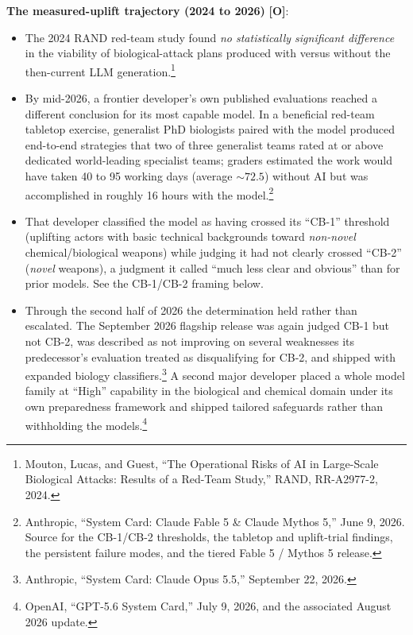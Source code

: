 \documentclass[11pt,letterpaper]{article}
\begin{document}
\textbf{The measured-uplift trajectory (2024 to 2026)} \textbf{[O]}:
\begin{itemize}[nosep]
  \item The 2024 RAND red-team study found \textit{no statistically significant difference} in the viability of biological-attack plans produced with versus without the then-current LLM generation.\footnote{Mouton, Lucas, and Guest, ``The Operational Risks of AI in Large-Scale Biological Attacks: Results of a Red-Team Study,'' RAND, RR-A2977-2, 2024.}
  \item By mid-2026, a frontier developer's own published evaluations reached a different conclusion for its most capable model. In a beneficial red-team tabletop exercise, generalist PhD biologists paired with the model produced end-to-end strategies that two of three generalist teams rated at or above dedicated world-leading specialist teams; graders estimated the work would have taken 40 to 95 working days (average ${\sim}72.5$) without AI but was accomplished in roughly 16 hours with the model.\footnote{Anthropic, ``System Card: Claude Fable 5 \& Claude Mythos 5,'' June 9, 2026. Source for the CB-1/CB-2 thresholds, the tabletop and uplift-trial findings, the persistent failure modes, and the tiered Fable 5 / Mythos 5 release.}
  \item That developer classified the model as having crossed its ``CB-1'' threshold (uplifting actors with basic technical backgrounds toward \textit{non-novel} chemical/biological weapons) while judging it had not clearly crossed ``CB-2'' (\textit{novel} weapons), a judgment it called ``much less clear and obvious'' than for prior models. See the CB-1/CB-2 framing below.
  \item Through the second half of 2026 the determination held rather than escalated. The September 2026 flagship release was again judged CB-1 but not CB-2, was described as not improving on several weaknesses its predecessor's evaluation treated as disqualifying for CB-2, and shipped with expanded biology classifiers.\footnote{Anthropic, ``System Card: Claude Opus 5.5,'' September 22, 2026.} A second major developer placed a whole model family at ``High'' capability in the biological and chemical domain under its own preparedness framework and shipped tailored safeguards rather than withholding the models.\footnote{OpenAI, ``GPT-5.6 System Card,'' July 9, 2026, and the associated August 2026 update.}

\end{itemize}
\end{document}
